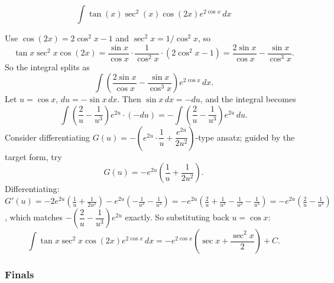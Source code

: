 \begin{questions}
\question
\[ \int \tan(x)\sec^2(x)\cos(2x)e^{2\cos x}\,dx \]
\begin{solution}
Use $\cos(2x) = 2\cos^2x-1$ and $\sec^2x = 1/\cos^2x$, so
\[ \tan x\sec^2x\cos(2x) = \frac{\sin x}{\cos x}\cdot\frac{1}{\cos^2x}\cdot(2\cos^2x-1) = \frac{2\sin x}{\cos x} - \frac{\sin x}{\cos^3x}. \]
So the integral splits as
\[ \int \left(\frac{2\sin x}{\cos x}-\frac{\sin x}{\cos^3x}\right)e^{2\cos x}\,dx. \]
Let $u=\cos x$, $du=-\sin x\,dx$. Then $\sin x\,dx = -du$, and the integral becomes
\[ \int \left(\frac{2}{u}-\frac{1}{u^3}\right)e^{2u}\cdot(-du) = -\int \left(\frac{2}{u}-\frac1{u^3}\right)e^{2u}\,du. \]
Consider differentiating $G(u) = -\left(e^{2u}\cdot\dfrac{1}{u}+\dfrac{e^{2u}}{2u^2}\right)$-type ansatz; guided by the target form, try
\[ G(u) = -e^{2u}\left(\frac1u+\frac{1}{2u^2}\right). \]
Differentiating: $G'(u) = -2e^{2u}\left(\frac1u+\frac1{2u^2}\right) - e^{2u}\left(-\frac1{u^2}-\frac1{u^3}\right) = -e^{2u}\left(\frac2u+\frac1{u^2}-\frac1{u^2}-\frac1{u^3}\right) = -e^{2u}\left(\frac2u - \frac{1}{u^3}\right)$,
which matches $-\left(\dfrac2u-\dfrac1{u^3}\right)e^{2u}$ exactly. So substituting back $u=\cos x$:
\[ \int \tan x\sec^2x\cos(2x)e^{2\cos x}\,dx = -e^{2\cos x}\left(\sec x+\frac{\sec^2x}{2}\right) + C. \]
\end{solution}

\end{questions}

\subsubsection*{Finals}
 
